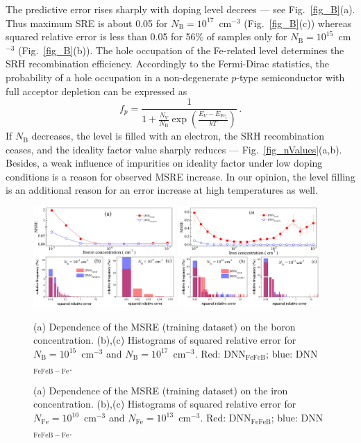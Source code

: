 \documentclass[num-refs]{wiley-article} %
\begin{document}
The predictive error rises sharply with doping level decrees --- see Fig.~\ref{fig_B}(a).
Thus maximum SRE is about 0.05 for $N_\mathrm{B}=10^{17}$~cm$^{-3}$ (Fig.~\ref{fig_B}(c))
whereas squared relative error is less than 0.05 for 56\% of samples only
for $N_\mathrm{B}=10^{15}$~cm$^{-3}$ (Fig.~\ref{fig_B}(b)).
The hole occupation of the Fe-related level determines the SRH recombination efficiency.
Accordingly to the Fermi-Dirac statistics, the probability of a hole
occupation in a non-degenerate $p$-type semiconductor with full acceptor depletion can be expressed as
\begin{equation}
\label{eqfp}
 f_p=\frac{1}{1+\frac{N_V}{N_\mathrm{B}}\exp\left(\frac{E_V-E_{\mathrm{Fe}_i}}{kT}\right)}\,.
\end{equation}
If $N_\mathrm{B}$ decreases, the level is filled with an electron,
the SRH recombination ceases, and the ideality factor value sharply reduces  --- Fig.~\ref{fig_nValues}(a,b).
Besides, a weak influence of impurities on ideality factor under low doping conditions is a reason
for observed MSRE increase.
In our opinion, the level filling is an additional reason for an error increase at high temperatures as well.


\begin{figure}[tb]
\centering
\includegraphics[width=0.48\textwidth]{F6} \hfill
\includegraphics[width=0.48\textwidth]{F7} \\
\parbox[t]{0.48\textwidth}
{\caption{(a) Dependence of the MSRE (training dataset) on the boron concentration.
(b),(c) Histograms of squared  relative error for $N_\mathrm{B}=10^{15}$~cm$^{-3}$ and $N_\mathrm{B}=10^{17}$~cm$^{-3}$.
Red: DNN$_\mathrm{FeFeB}$; blue: DNN$_\mathrm{FeFeB-Fe}$.
}
\label{fig_B}} \hfill
\parbox[t]{0.48\textwidth}{\caption{(a) Dependence of the MSRE (training dataset) on the iron concentration.
(b),(c) Histograms of squared  relative error for $N_\mathrm{Fe}=10^{10}$~cm$^{-3}$ and $N_\mathrm{Fe}=10^{13}$~cm$^{-3}$.
Red: DNN$_\mathrm{FeFeB}$; blue: DNN$_\mathrm{FeFeB-Fe}$.}
\label{fig_Fe}}
\end{figure}
\end{document}
